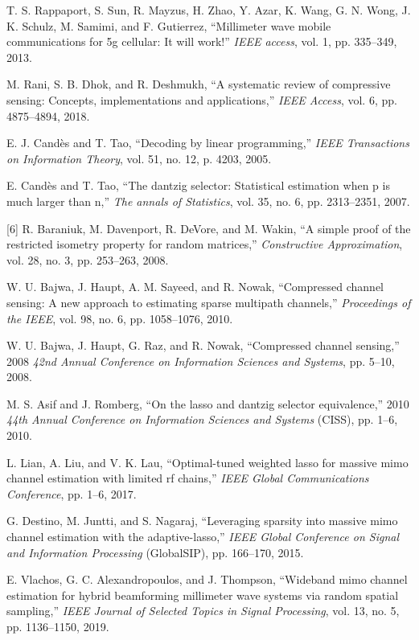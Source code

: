 \documentclass[journal]{IEEEtran}
\begin{document}
\begin{thebibliography}{30}
T. S. Rappaport, S. Sun, R. Mayzus, H. Zhao, Y. Azar, K. Wang, G. N. Wong, J. K. Schulz, M. Samimi, and F. Gutierrez, “Millimeter wave mobile communications for 5g cellular: It will work!” \textit {IEEE access}, vol. 1, pp. 335–349, 2013.

M. Rani, S. B. Dhok, and R. Deshmukh, “A systematic review of compressive sensing: Concepts, implementations and applications,” \textit {IEEE Access}, vol. 6, pp. 4875–4894, 2018.

E. J. Candès and T. Tao, “Decoding by linear programming,” \textit {IEEE Transactions on Information Theory}, vol. 51, no. 12, p. 4203, 2005.

E. Candès and T. Tao, “The dantzig selector: Statistical estimation when p is much larger than n,” \textit {The annals of Statistics}, vol. 35, no. 6, pp. 2313–2351, 2007.

[6] R. Baraniuk, M. Davenport, R. DeVore, and M. Wakin, “A simple proof of the restricted isometry property for random matrices,” \textit {Constructive Approximation}, vol. 28, no. 3, pp. 253–263, 2008.

W. U. Bajwa, J. Haupt, A. M. Sayeed, and R. Nowak, “Compressed channel sensing: A new approach to estimating sparse multipath channels,” \textit {Proceedings of the IEEE}, vol. 98, no. 6, pp. 1058–1076, 2010.

W. U. Bajwa, J. Haupt, G. Raz, and R. Nowak, “Compressed channel sensing,” 2008 \textit {42nd Annual Conference on Information Sciences and Systems}, pp. 5–10, 2008.

M. S. Asif and J. Romberg, “On the lasso and dantzig selector equivalence,” 2010 \textit {44th Annual Conference on Information Sciences and Systems} (CISS), pp. 1–6, 2010.

L. Lian, A. Liu, and V. K. Lau, “Optimal-tuned weighted lasso for massive mimo channel estimation with limited rf chains,” \textit {IEEE Global Communications Conference}, pp. 1–6, 2017.

G. Destino, M. Juntti, and S. Nagaraj, “Leveraging sparsity into massive mimo channel estimation with the adaptive-lasso,” \textit {IEEE Global Conference on Signal and Information Processing} (GlobalSIP), pp. 166–170, 2015.

E. Vlachos, G. C. Alexandropoulos, and J. Thompson, “Wideband mimo channel estimation for hybrid beamforming millimeter wave systems via random spatial sampling,” \textit {IEEE Journal of Selected Topics in Signal Processing}, vol. 13, no. 5, pp. 1136–1150, 2019.


\end{thebibliography}
\end{document}
